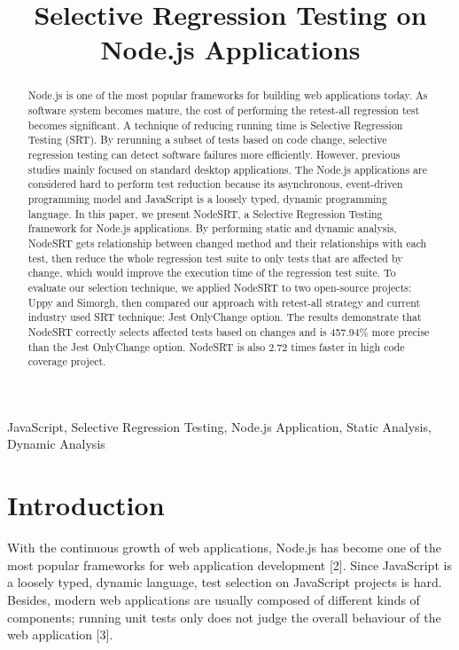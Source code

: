 \documentclass[10pt, conference]{IEEEtran}
\begin{document}
\title{Selective Regression Testing on Node.js Applications}

\author{
}

\maketitle

\begin{abstract}
Node.js is one of the most popular frameworks for building web applications today. As software system 
becomes mature, the cost of performing the retest-all regression test becomes significant. A technique 
of reducing running time is Selective Regression Testing (SRT). By rerunning a subset of tests based on 
code change, selective regression testing can detect software failures more efficiently. However, 
previous studies mainly focused on standard desktop applications. The Node.js applications are 
considered hard to perform test reduction because its asynchronous, event-driven programming model and 
JavaScript is a loosely typed, dynamic programming language. 
In this paper, we present NodeSRT, a Selective Regression Testing framework for Node.js applications. 
By performing static and dynamic analysis, NodeSRT gets relationship between changed method and their 
relationships with each test, then reduce the whole regression test suite to only tests that are 
affected by change, which would improve the execution time of the regression test suite. 
To evaluate our selection technique, we applied NodeSRT to two open-source projects: Uppy and Simorgh, 
then compared our approach with retest-all strategy and current industry used SRT technique: Jest 
OnlyChange option. The results demonstrate that NodeSRT correctly selects affected tests based on 
changes and is 457.94\% more precise than the Jest OnlyChange option. NodeSRT is also 2.72 times faster in 
high code coverage project.
    
\end{abstract}

\begin{IEEEkeywords}
JavaScript, Selective Regression Testing, Node.js Application, Static Analysis, Dynamic Analysis
\end{IEEEkeywords}

\section{Introduction}
With the continuous growth of web applications, Node.js has become one of the most popular frameworks 
for web application development [2]. Since JavaScript is a loosely typed, dynamic language, test 
selection on JavaScript projects is hard. Besides, modern web applications are usually composed of 
different kinds of components; running unit tests only does not judge the overall behaviour of the web 
application [3]. 
\end{document}
